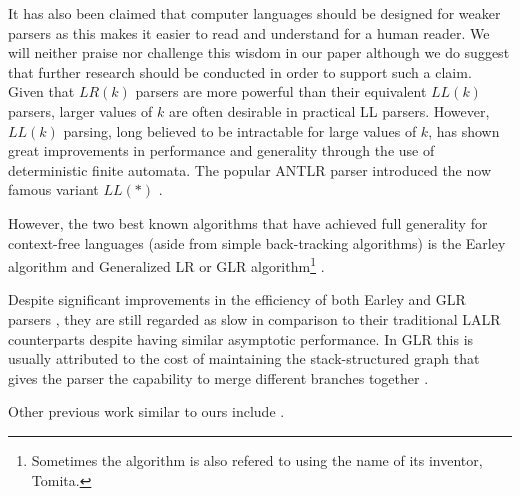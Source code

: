 \documentclass[a4paper,11pt]{article}
\begin{document}
It has also been claimed that computer languages should be designed for weaker parsers as this makes it easier to read and understand for a human reader.
We will neither praise nor challenge this wisdom in our paper although we do suggest that further research should be conducted in order to support such a claim.\\ %

Given that $LR(k)$ parsers are more powerful than their equivalent $LL(k)$ parsers, larger values of $k$ are often desirable in practical LL parsers.
However, $LL(k)$ parsing, long believed to be intractable for large values of $k$, has shown great improvements in performance and generality through the use of deterministic finite automata. %
The popular ANTLR parser introduced the now famous variant $LL(*)$ \cite{193241}. %

However, the two best known algorithms that have achieved full generality for context-free languages (aside from simple back-tracking algorithms) is the Earley algorithm \cite{362035} and Generalized LR or GLR algorithm\footnote{Sometimes the algorithm is also refered to using the name of its inventor, Tomita.} \cite{980564, 1623625}.

Despite significant improvements in the efficiency of both Earley and GLR parsers \cite{1146810, Mcpeak04elkhound:a}, they are still regarded as slow in comparison to their traditional LALR counterparts despite having similar asymptotic performance.
In GLR this is usually attributed to the cost of maintaining the stack-structured graph that gives the parser the capability to merge different branches together \cite{Mcpeak04elkhound:a}.

Other previous work similar to ours include \cite{991520, Marc80, 1287949, 146993, DBLP:conf/wia/GalvezSF06}. %
\end{document}
